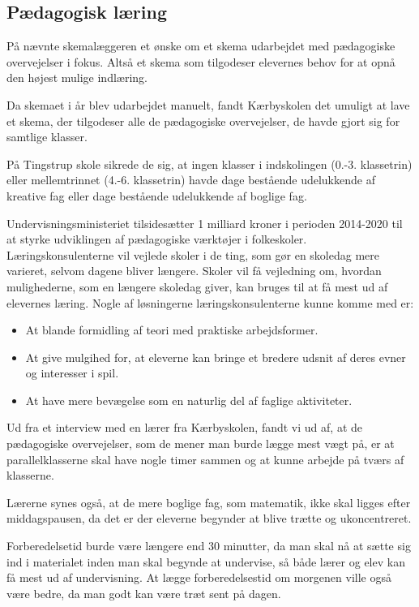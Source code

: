 \subsection{Pædagogisk læring}
\label{paedagogisk_laering}
På \school nævnte skemalæggeren et ønske om et skema udarbejdet med pædagogiske overvejelser i fokus. Altså et skema som tilgodeser elevernes behov for at opnå den højest mulige indlæring.

Da skemaet i år blev udarbejdet manuelt, fandt Kærbyskolen det umuligt at lave et skema, der tilgodeser alle de pædagogiske overvejelser, de havde gjort sig for samtlige klasser\cite{interview_Kaerby}.

På Tingstrup skole sikrede de sig, at ingen klasser i indskolingen (0.-3. klassetrin) eller mellemtrinnet (4.-6. klassetrin) havde dage bestående udelukkende af kreative fag eller dage bestående udelukkende af boglige fag. 

Undervisningsministeriet tilsidesætter 1 milliard kroner i perioden 2014-2020 til at styrke udviklingen af pædagogiske værktøjer i folkeskoler. Læringskonsulenterne vil vejlede skoler i de ting, som gør en skoledag mere varieret, selvom dagene bliver længere. Skoler vil få vejledning om, hvordan mulighederne, som en længere skoledag giver, kan bruges til at få mest ud af elevernes læring. Nogle af løsningerne læringskonsulenterne kunne komme med er:
\begin{itemize}
	\item At blande formidling af teori med praktiske arbejdsformer.
	\item At give mulgihed for, at eleverne kan bringe et bredere udsnit af deres evner og interesser i spil.
	\item At have mere bevægelse som en naturlig del af faglige aktiviteter\cite{Paedagogisklaering}.
\end{itemize}
Ud fra et interview med en lærer fra Kærbyskolen, fandt vi ud af, at de pædagogiske overvejelser, som de mener man burde lægge mest vægt på, er at parallelklasserne skal have nogle timer sammen og at kunne arbejde på tværs af klasserne.

Lærerne synes også, at de mere boglige fag, som matematik, ikke skal ligges efter middagspausen, da det er der eleverne begynder at blive trætte og ukoncentreret. 

Forberedelsetid burde være længere end 30 minutter, da man skal nå at sætte sig ind i materialet inden man skal begynde at undervise, så både lærer og elev kan få mest ud af undervisning. At lægge forberedelsestid om morgenen ville også være bedre, da man godt kan være træt sent på dagen.